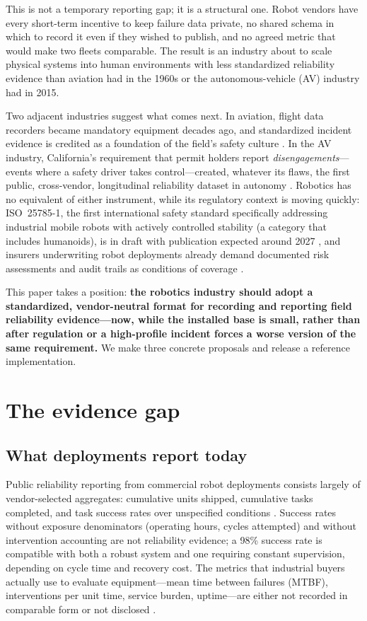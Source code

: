 \documentclass[11pt]{article}
\begin{document}
This is not a temporary reporting gap; it is a structural one. Robot vendors
have every short-term incentive to keep failure data private, no shared
schema in which to record it even if they wished to publish, and no agreed
metric that would make two fleets comparable. The result is an industry
about to scale physical systems into human environments with less
standardized reliability evidence than aviation had in the 1960s or the
autonomous-vehicle (AV) industry had in 2015.

Two adjacent industries suggest what comes next. In aviation, flight data
recorders became mandatory equipment decades ago, and standardized incident
evidence is credited as a foundation of the field's safety culture
\citep{icao2016annex6}. In the AV industry, California's requirement that
permit holders report \emph{disengagements}---events where a safety driver
takes control---created, whatever its flaws, the first public,
cross-vendor, longitudinal reliability dataset in autonomy
\citep{dmv2024disengagement}. Robotics has no equivalent of either
instrument, while its regulatory context is moving quickly: ISO~25785-1,
the first international safety standard specifically addressing industrial
mobile robots with actively controlled stability (a category that includes
humanoids), is in draft with publication expected around 2027
\citep{iso25785}, and insurers underwriting robot deployments already
demand documented risk assessments and audit trails as conditions of
coverage \citep{humanoidliability2026}.

This paper takes a position: \textbf{the robotics industry should adopt a
standardized, vendor-neutral format for recording and reporting field
reliability evidence---now, while the installed base is small, rather than
after regulation or a high-profile incident forces a worse version of the
same requirement.} We make three concrete proposals and release a reference
implementation.

\section{The evidence gap}

\subsection{What deployments report today}

Public reliability reporting from commercial robot deployments consists
largely of vendor-selected aggregates: cumulative units shipped, cumulative
tasks completed, and task success rates over unspecified conditions
\citep{karp2026reality}. Success rates without exposure denominators
(operating hours, cycles attempted) and without intervention accounting are
not reliability evidence; a 98\% success rate is compatible with both a
robust system and one requiring constant supervision, depending on cycle
time and recovery cost. The metrics that industrial buyers actually use to
evaluate equipment---mean time between failures (MTBF), interventions per
unit time, service burden, uptime---are either not recorded in comparable
form or not disclosed \citep{newmarketpitch2026}.
\end{document}
